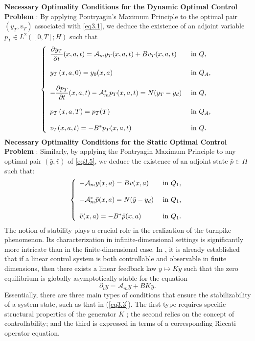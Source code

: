 \documentclass[10pt, a4]{amsart}
\theoremstyle{plain}
\theoremstyle{definition}
\theoremstyle{remark}
\numberwithin{equation}{section}
\begin{document}
{\bf Necessary Optimality Conditions for the Dynamic Optimal Control Problem} :  
By applying Pontryagin’s Maximum Principle to the optimal pair \((y_T,v_T)\) associated with \eqref{eq3.1}, we deduce the existence of an adjoint variable \(p_T \in L^2([0,T]; H)\) such that
 \begin{equation}\label{eq3.9}	
\left\lbrace\begin{array}{ll}
\dfrac{\partial y_T}{\partial t}(x,a,t)=\mathcal{A}_m y_T(x,a,t)+Bv_T(x,a,t) &\hbox{ in }Q,\\  
\\y_T\left(x,a,0\right)=y_{0}(x,a)&\hbox{ in }  Q_A,\\
\\-\dfrac{\partial p_T}{\partial t}(x,a,t)-\mathcal{A}^*_m p_T(x,a,t)=N(y_T-y_d) &\hbox{ in }Q,\\  
\\p_T\left(x,a,T\right)=p_T(T) &\hbox{ in }Q_A,\\
\\ v_T(x,a,t)=-B^*p_T(x,a,t) &\hbox{ in }Q.
	\end{array}\right.
\end{equation}
{\bf Necessary Optimality Conditions for the Static Optimal Control Problem} : Similarly, by applying the Pontryagin Maximum Principle to any optimal pair $(\bar{y}, \bar{v})$ of \eqref{eq3.5}, we deduce the existence of an adjoint state $\bar{p} \in H$ such that:
 \begin{equation}\label{eq3.10}	 
	\left\lbrace\begin{array}{ll}
	-\mathcal{A}_m\bar{y}(x,a)=B\bar{v} (x,a) &\hbox{ in }Q_1,\\  
\\-\mathcal{A}^*_m \bar{p}(x,a)=N(\bar{y}-y_d) &\hbox{ in }Q_1,\\
\\\bar{v}(x,a)=-B^*\Bar{p}(x,a) & \hbox{ in }Q_1.
	\end{array}\right.
\end{equation}
The notion of stability plays a crucial role in the realization of the turnpike phenomenon. Its characterization in infinite-dimensional settings is significantly more intricate than in the finite-dimensional case. In \cite{ref31}, it is already established that if a linear control system is both controllable and observable in finite dimensions, then there exists a linear feedback law  \(y\mapsto Ky\) such that the zero equilibrium is globally asymptotically stable for the equation  
\[
\partial_t y = \mathcal{A}_my + BK y.
\]
Essentially, there are three main types of conditions that ensure the stabilizability of a system state, such as that in (\ref{eq3.3}). The first type requires specific structural properties of the generator $K$ ; the second relies on the concept of controllability; and the third is expressed in terms of a corresponding Riccati operator equation.
\end{document}
